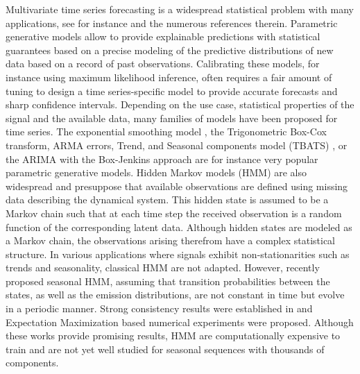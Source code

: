 \documentclass[lettersize,journal]{IEEEtran}
\begin{document}
Multivariate time series forecasting is a widespread statistical problem with  many applications, see for instance \cite{sarkka2013bayesian, douc2014nonlinear, zucchini2017hidden} and the numerous references therein.
Parametric generative models allow to provide explainable predictions with statistical guarantees based on a precise modeling of the predictive distributions of new data based on a record of past observations. %
Calibrating these models, for instance using maximum likelihood inference, often requires a fair amount of tuning to design a time series-specific model to provide  accurate forecasts and sharp confidence intervals.  Depending on the use case, statistical properties of the signal and the available data, many families of models have been proposed for time series.  The exponential smoothing model \cite{RePEc:inm:oropre:v:9:y:1961:i:5:p:673-685}, the Trigonometric Box-Cox transform, ARMA errors, Trend, and Seasonal components model (TBATS) \cite{doi:10.1198/jasa.2011.tm09771}, or the ARIMA with the Box-Jenkins approach \cite{box2015time} are for instance very popular parametric generative models.  Hidden Markov models (HMM) are also widespread and presuppose that available observations are defined using missing data describing the dynamical system. This hidden state is assumed to be a Markov chain such that at each time step the received observation is a random function of the corresponding latent data.  Although hidden states are modeled as a Markov chain, the observations arising therefrom have a complex statistical structure. %
In various applications where signals exhibit non-stationarities such as trends and seasonality, classical HMM are not adapted. However, \cite{touron2017modeling}  recently proposed seasonal HMM, assuming that transition probabilities between the states, as well as the emission distributions, are not constant in time but evolve in a periodic manner. Strong consistency results were established in \cite{touron2019consistency} and Expectation Maximization based numerical experiments were proposed.
Although these works provide promising results, HMM are computationally expensive to train and are not yet well studied for seasonal  sequences with thousands of components.
 
\end{document}

